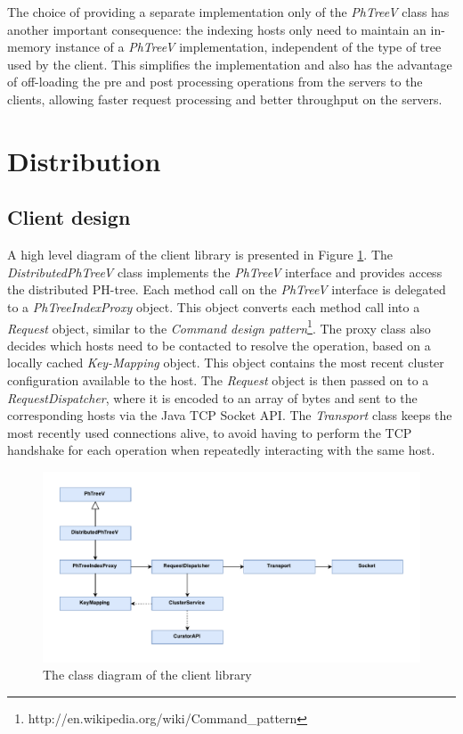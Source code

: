 \documentclass[11pt,a4paper]{globis-book}
\begin{document}
The choice of providing a separate implementation only of the \textit{PhTreeV} class has another important consequence: the indexing hosts only need to maintain an in-memory instance of a \textit{PhTreeV} implementation, independent of the type of tree used by the client. This simplifies the implementation and also has the advantage of off-loading the pre and post processing operations from the servers to the clients, allowing faster request processing and better throughput on the servers. 

\section{Distribution}

\subsection{Client design}

A high level diagram of the client library is presented in Figure \ref{fig:Client-library}. The \textit{DistributedPhTreeV} class implements the \textit{PhTreeV} interface and provides access the distributed PH-tree. Each method call on the \textit{PhTreeV} interface is delegated to a \textit{PhTreeIndexProxy} object. This object converts each method call into a \textit{Request} object, similar to the \textit{Command design pattern}\footnote{http://en.wikipedia.org/wiki/Command\_pattern}. The proxy class also decides which hosts need to be contacted to resolve the operation, based on a locally cached \textit{Key-Mapping} object. This object contains the most recent cluster configuration available to the host. The \textit{Request} object is then passed on to a \textit{RequestDispatcher}, where it is encoded to an array of bytes and sent to the corresponding hosts via the Java TCP Socket API. The \textit{Transport} class keeps the most recently used connections alive, to avoid having to perform the TCP handshake for each operation when repeatedly interacting with the same host. 

\begin{figure}[h]
    \centering 
    \includegraphics[scale=0.9]{images/Client}
    \caption{The class diagram of the client library}
    \label{fig:Client-library}
\end{figure}
\end{document}
